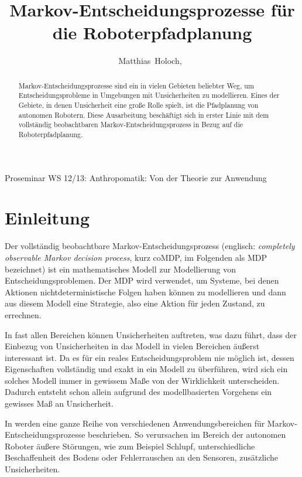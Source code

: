 \documentclass[a4paper]{IEEEtran}
\begin{document}
\title{Markov-Entscheidungsprozesse für die Roboterpfadplanung}

\author{Matthias~Holoch,~}%




%
{Proseminar WS 12/13: Anthropomatik: Von der Theorie zur Anwendung}



\maketitle


\begin{abstract}
Markov-Entscheidungsprozesse sind ein in vielen Gebieten beliebter Weg, um Entscheidungsprobleme in Umgebungen mit Unsicherheiten zu modellieren. Eines der Gebiete, in denen Unsicherheit eine große Rolle spielt, ist die Pfadplanung von autonomen Robotern. Diese Ausarbeitung beschäftigt sich in erster Linie mit dem vollständig beobachtbaren Markov-Entscheidungsprozess in Bezug auf die Roboterpfadplanung.
\end{abstract}


\section{Einleitung}
Der vollständig beobachtbare Markov-Entscheidungsprozess (englisch: \emph{completely observable Markov decision process}, kurz coMDP, im Folgenden als MDP bezeichnet) ist ein mathematisches Modell zur Modellierung von Entscheidungsproblemen. Der MDP wird verwendet, um Systeme, bei denen Aktionen nichtdeterministische Folgen haben können zu modellieren und dann aus diesem Modell eine Strategie, also eine Aktion für jeden Zustand, zu errechnen.

In fast allen Bereichen können Unsicherheiten auftreten, was dazu führt, dass der Einbezug von Unsicherheiten in das Modell in vielen Bereichen äußerst interessant ist. Da es für ein reales Entscheidungsproblem nie möglich ist, dessen Eigenschaften vollständig und exakt in ein Modell zu überführen, wird sich ein solches Modell immer in gewissem Maße von der Wirklichkeit unterscheiden. Dadurch entsteht schon allein aufgrund des modellbasierten Vorgehens ein gewisses Maß an Unsicherheit.

In \cite{cassandra1998survey} werden eine ganze Reihe von verschiedenen Anwendungsbereichen für Markov-Entscheidungsprozesse beschrieben. So verursachen im Bereich der autonomen Roboter äußere Störungen, wie zum Beispiel Schlupf, unterschiedliche Beschaffenheit des Bodens oder Fehlerrauschen an den Sensoren, zusätzliche Unsicherheiten.
\end{document}
